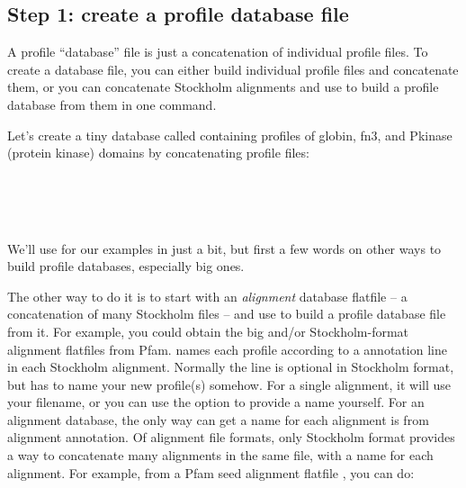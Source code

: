 \subsection{Step 1: create a profile database file}

A profile ``database'' file is just a concatenation of individual
profile files. To create a database file, you can either build
individual profile files and concatenate them, or you can concatenate
Stockholm alignments and use  to build a profile database
from them in one command.

Let's create a tiny database called  containing profiles
of globin, fn3, and Pkinase (protein kinase) domains by concatenating
profile files:

   \vspace{1ex}
   \\
   \\
   \\
   \vspace{1ex}

We'll use  for our examples in just a bit, but first a
few words on other ways to build profile databases, especially big ones.

The other way to do it is to start with an \emph{alignment} database
flatfile -- a concatenation of many Stockholm files -- and use
 to build a profile database file from it.  For
example, you could obtain the big  and/or
 Stockholm-format alignment flatfiles from Pfam.
 names each profile according to a 
annotation line in each Stockholm alignment. Normally the 
line is optional in Stockholm format, but  has to name
your new profile(s) somehow. For a single alignment, it will use your
filename, or you can use the  option to
provide a name yourself. For an alignment database, the only way
 can get a name for each alignment is from alignment
annotation.  Of alignment file formats, only Stockholm format provides a
way to concatenate many alignments in the same file, with a name for
each alignment. For example, from a Pfam seed alignment flatfile
, you can do:

